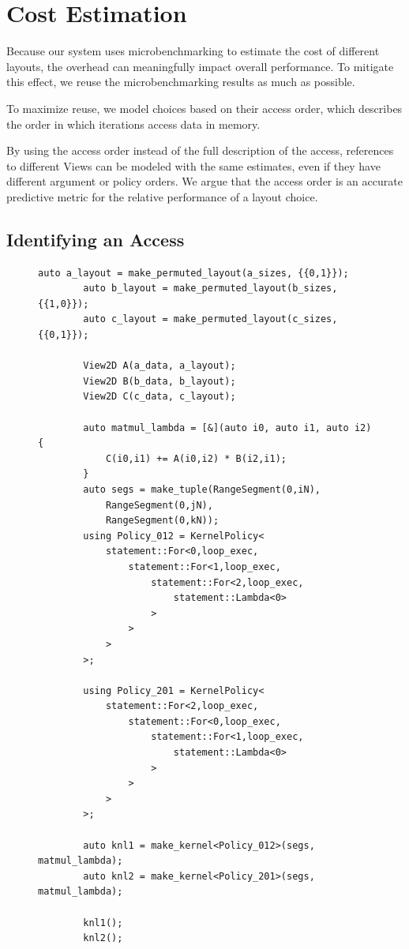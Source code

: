 \documentclass[sigconf]{acmart}
\begin{document}
\section{Cost Estimation}


Because our system uses microbenchmarking to estimate the cost of different layouts, the overhead can meaningfully impact overall performance. 
To mitigate this effect, we reuse the microbenchmarking results as much as possible.
 
To maximize reuse, we model choices based on their access order, which describes the order in which iterations access data in memory.

By using the access order instead of the full description of the access, references to different Views can be modeled with the same estimates, even if they have different argument or policy orders.
We argue that the access order is an accurate predictive metric for the relative performance of a layout choice. 

\subsection{Identifying an Access}
\begin{figure}
	\begin{lstlisting}[caption={Two implementations of matrix multiplication using different kernel policies.},
		label={MatMulTraversalOrder}]
		auto a_layout = make_permuted_layout(a_sizes, {{0,1}});
		auto b_layout = make_permuted_layout(b_sizes, {{1,0}});
		auto c_layout = make_permuted_layout(c_sizes, {{0,1}});

		View2D A(a_data, a_layout);
		View2D B(b_data, b_layout);
		View2D C(c_data, c_layout);

		auto matmul_lambda = [&](auto i0, auto i1, auto i2) {
			C(i0,i1) += A(i0,i2) * B(i2,i1);
		}
		auto segs = make_tuple(RangeSegment(0,iN), 
			RangeSegment(0,jN), 
			RangeSegment(0,kN));
		using Policy_012 = KernelPolicy<
			statement::For<0,loop_exec,
				statement::For<1,loop_exec,
					statement::For<2,loop_exec,
						statement::Lambda<0>
					>
				>
			>
		>;

		using Policy_201 = KernelPolicy<
			statement::For<2,loop_exec,
				statement::For<0,loop_exec,
					statement::For<1,loop_exec,
						statement::Lambda<0>
					>
				>
			>
		>;

		auto knl1 = make_kernel<Policy_012>(segs, matmul_lambda);
		auto knl2 = make_kernel<Policy_201>(segs, matmul_lambda);

		knl1();
		knl2();
	\end{lstlisting}
\end{figure}
\end{document}
